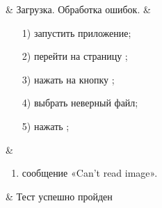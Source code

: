 \begin{longtable}
	 & Загрузка. Обработка ошибок. & 
   			\begin{enumerate}
				\item[1)] запустить приложение;
				\item[2)] перейти на страницу \imrPage{};
				\item[3)] нажать на кнопку \selectButton{};
				\item[4)] выбрать неверный файл;
				\item[5)] нажать \submitButton{};
			\end{enumerate}
   			& 
   			\begin{enumerate}
   				\item сообщение «Can't read image».
   			\end{enumerate}
   			& Тест успешно пройден \\ 	
   \hline
\end{longtable}

